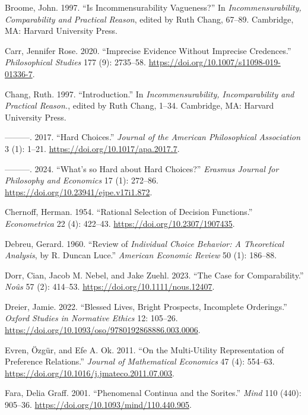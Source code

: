 \documentclass[
  10.5pt,
  twoside]{article}
\newlength{\cslhangindent}
\newenvironment{CSLReferences}[2] %
 {\begin{list}{}{%
  \setlength{\itemindent}{0pt}
  \setlength{\leftmargin}{0pt}
  \setlength{\parsep}{0pt}
  \ifodd #1
   \setlength{\leftmargin}{\cslhangindent}
   \setlength{\itemindent}{-1\cslhangindent}
  \fi
  \setlength{\itemsep}{#2\baselineskip}}}
 {\end{list}}
\begin{document}
\begin{CSLReferences}{1}{0}
Broome, John. 1997. {``Is Incommensurability Vagueness?''} In
\emph{Incommensurability, Comparability and Practical Reason}, edited by
Ruth Chang, 67--89. Cambridge, MA: Harvard University Press.

Carr, Jennifer Rose. 2020. {``Imprecise Evidence Without Imprecise
Credences.''} \emph{Philosophical Studies} 177 (9): 2735--58.
\url{https://doi.org/10.1007/s11098-019-01336-7}.

Chang, Ruth. 1997. {``Introduction.''} In \emph{Incommensurability,
Incomparability and Practical Reason.}, edited by Ruth Chang, 1--34.
Cambridge, MA: Harvard University Press.

---------. 2017. {``Hard Choices.''} \emph{Journal of the American
Philosophical Association} 3 (1): 1--21.
\url{https://doi.org/10.1017/apa.2017.7}.

---------. 2024. {``What's so Hard about Hard Choices?''} \emph{Erasmus
Journal for Philosophy and Economics} 17 (1): 272--86.
\url{https://doi.org/10.23941/ejpe.v17i1.872}.

Chernoff, Herman. 1954. {``Rational Selection of Decision Functions.''}
\emph{Econometrica} 22 (4): 422--43.
\url{https://doi.org/10.2307/1907435}.

Debreu, Gerard. 1960. {``Review of \emph{Individual Choice Behavior: A
Theoretical Analysis}, by {R. Duncan Luce}.''} \emph{American Economic
Review} 50 (1): 186--88.

Dorr, Cian, Jacob M. Nebel, and Jake Zuehl. 2023. {``The Case for
Comparability.''} \emph{Noûs} 57 (2): 414--53.
\url{https://doi.org/10.1111/nous.12407}.

Dreier, Jamie. 2022. {``Blessed Lives, Bright Prospects, Incomplete
Orderings.''} \emph{Oxford Studies in Normative Ethics} 12: 105--26.
\url{https://doi.org/10.1093/oso/9780192868886.003.0006}.

Evren, Özgür, and Efe A. Ok. 2011. {``On the Multi-Utility
Representation of Preference Relations.''} \emph{Journal of Mathematical
Economics} 47 (4): 554--63.
\url{https://doi.org/10.1016/j.jmateco.2011.07.003}.

Fara, Delia Graff. 2001. {``Phenomenal Continua and the Sorites.''}
\emph{Mind} 110 (440): 905--36.
\url{https://doi.org/10.1093/mind/110.440.905}.


\end{CSLReferences}
\end{document}
